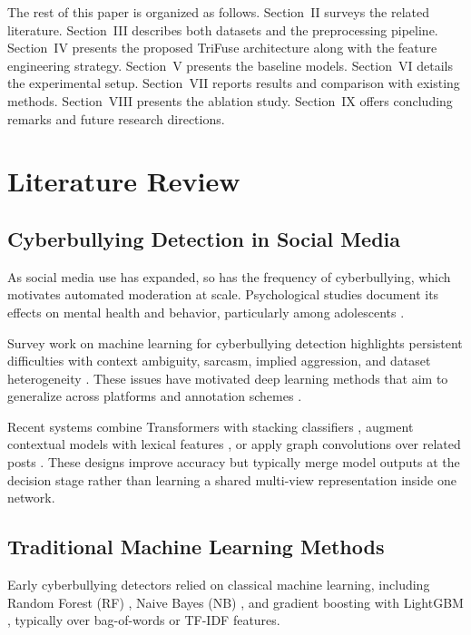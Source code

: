 The rest of this paper is organized as follows. Section~II surveys the related literature. Section~III describes both datasets and the preprocessing pipeline. Section~IV presents the proposed TriFuse architecture along with the feature engineering strategy. Section~V presents the baseline models. Section~VI details the experimental setup. Section~VII reports results and comparison with existing methods. Section~VIII presents the ablation study. Section~IX offers concluding remarks and future research directions.

\section{Literature Review}

\subsection{Cyberbullying Detection in Social Media}

As social media use has expanded, so has the frequency of cyberbullying, which motivates automated moderation at scale. Psychological studies document its effects on mental health and behavior, particularly among adolescents \cite{ref1}.

Survey work on machine learning for cyberbullying detection highlights persistent difficulties with context ambiguity, sarcasm, implied aggression, and dataset heterogeneity \cite{ref12}. These issues have motivated deep learning methods that aim to generalize across platforms and annotation schemes \cite{ref13}.

Recent systems combine Transformers with stacking classifiers \cite{ref14}, augment contextual models with lexical features \cite{ref15, ref16}, or apply graph convolutions over related posts \cite{ref17}. These designs improve accuracy but typically merge model outputs at the decision stage rather than learning a shared multi-view representation inside one network.

\subsection{Traditional Machine Learning Methods}

Early cyberbullying detectors relied on classical machine learning, including Random Forest (RF) \cite{ref5}, Naive Bayes (NB) \cite{ref18}, and gradient boosting with LightGBM \cite{ref6}, typically over bag-of-words or TF-IDF features.

